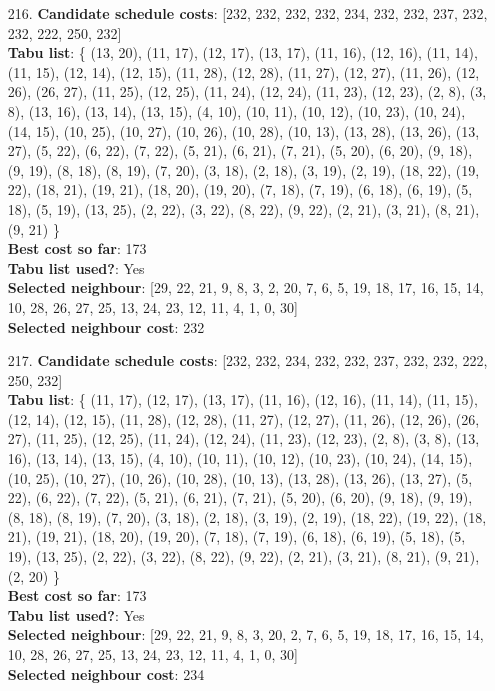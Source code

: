 \documentclass[fleqn]{article}
\begin{document}
\begin{itemize}
    \item[216.] \textbf{Candidate schedule costs}: [232, 232, 232, 232, 234, 232, 232, 237, 232, 232, 222, 250, 232] \\
    \textbf{Tabu list}: \{ (13, 20), (11, 17), (12, 17), (13, 17), (11, 16), (12, 16), (11, 14), (11, 15), (12, 14), (12, 15), (11, 28), (12, 28), (11, 27), (12, 27), (11, 26), (12, 26), (26, 27), (11, 25), (12, 25), (11, 24), (12, 24), (11, 23), (12, 23), (2, 8), (3, 8), (13, 16), (13, 14), (13, 15), (4, 10), (10, 11), (10, 12), (10, 23), (10, 24), (14, 15), (10, 25), (10, 27), (10, 26), (10, 28), (10, 13), (13, 28), (13, 26), (13, 27), (5, 22), (6, 22), (7, 22), (5, 21), (6, 21), (7, 21), (5, 20), (6, 20), (9, 18), (9, 19), (8, 18), (8, 19), (7, 20), (3, 18), (2, 18), (3, 19), (2, 19), (18, 22), (19, 22), (18, 21), (19, 21), (18, 20), (19, 20), (7, 18), (7, 19), (6, 18), (6, 19), (5, 18), (5, 19), (13, 25), (2, 22), (3, 22), (8, 22), (9, 22), (2, 21), (3, 21), (8, 21), (9, 21) \} \\
    \textbf{Best cost so far}: 173 \\
    \textbf{Tabu list used?}: Yes \\
    \textbf{Selected neighbour}: [29, 22, 21, 9, 8, 3, 2, 20, 7, 6, 5, 19, 18, 17, 16, 15, 14, 10, 28, 26, 27, 25, 13, 24, 23, 12, 11, 4, 1, 0, 30] \\
    \textbf{Selected neighbour cost}: 232
      

    \item[217.] \textbf{Candidate schedule costs}: [232, 232, 234, 232, 232, 237, 232, 232, 222, 250, 232] \\
    \textbf{Tabu list}: \{ (11, 17), (12, 17), (13, 17), (11, 16), (12, 16), (11, 14), (11, 15), (12, 14), (12, 15), (11, 28), (12, 28), (11, 27), (12, 27), (11, 26), (12, 26), (26, 27), (11, 25), (12, 25), (11, 24), (12, 24), (11, 23), (12, 23), (2, 8), (3, 8), (13, 16), (13, 14), (13, 15), (4, 10), (10, 11), (10, 12), (10, 23), (10, 24), (14, 15), (10, 25), (10, 27), (10, 26), (10, 28), (10, 13), (13, 28), (13, 26), (13, 27), (5, 22), (6, 22), (7, 22), (5, 21), (6, 21), (7, 21), (5, 20), (6, 20), (9, 18), (9, 19), (8, 18), (8, 19), (7, 20), (3, 18), (2, 18), (3, 19), (2, 19), (18, 22), (19, 22), (18, 21), (19, 21), (18, 20), (19, 20), (7, 18), (7, 19), (6, 18), (6, 19), (5, 18), (5, 19), (13, 25), (2, 22), (3, 22), (8, 22), (9, 22), (2, 21), (3, 21), (8, 21), (9, 21), (2, 20) \} \\
    \textbf{Best cost so far}: 173 \\
    \textbf{Tabu list used?}: Yes \\
    \textbf{Selected neighbour}: [29, 22, 21, 9, 8, 3, 20, 2, 7, 6, 5, 19, 18, 17, 16, 15, 14, 10, 28, 26, 27, 25, 13, 24, 23, 12, 11, 4, 1, 0, 30] \\
    \textbf{Selected neighbour cost}: 234
      


\end{itemize}
\end{document}
